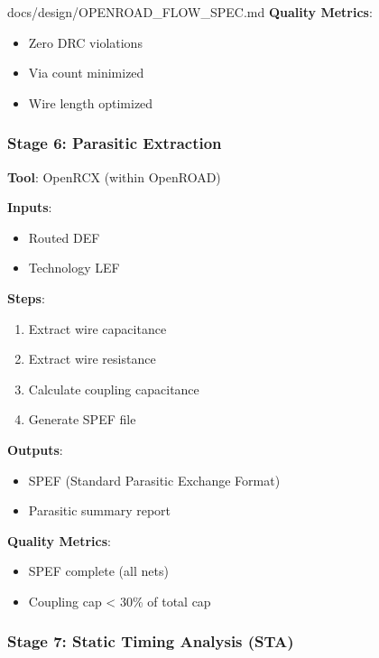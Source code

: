 \begin{relocated}{docs/design/OPENROAD_FLOW_SPEC.md}
\textbf{Quality Metrics}:

\begin{itemize}
\tightlist
\item
  Zero DRC violations
\item
  Via count minimized
\item
  Wire length optimized
\end{itemize}

\subsubsection{Stage 6: Parasitic Extraction}\label{tm:pd:openroad-flow:stage-6-parasitic-extraction}

\textbf{Tool}: OpenRCX (within OpenROAD)

\textbf{Inputs}:

\begin{itemize}
\tightlist
\item
  Routed DEF
\item
  Technology LEF
\end{itemize}

\textbf{Steps}:

\begin{enumerate}
\def\labelenumi{\arabic{enumi}.}
\tightlist
\item
  Extract wire capacitance
\item
  Extract wire resistance
\item
  Calculate coupling capacitance
\item
  Generate SPEF file
\end{enumerate}

\textbf{Outputs}:

\begin{itemize}
\tightlist
\item
  SPEF (Standard Parasitic Exchange Format)
\item
  Parasitic summary report
\end{itemize}

\textbf{Quality Metrics}:

\begin{itemize}
\tightlist
\item
  SPEF complete (all nets)
\item
  Coupling cap \textless{} 30\% of total cap
\end{itemize}

\subsubsection{Stage 7: Static Timing Analysis (STA)}\label{tm:pd:openroad-flow:stage-7-static-timing-analysis-sta}


\end{relocated}
